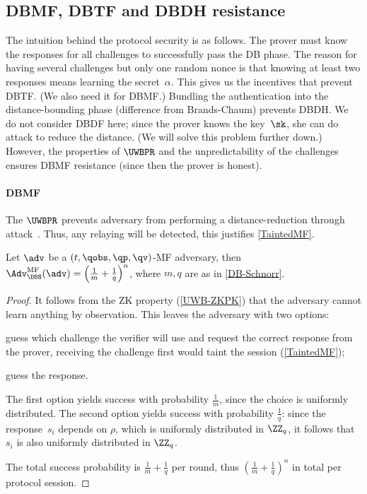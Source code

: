 \subsection{\acs*{DBMF}, \acs*{DBTF} and \acs*{DBDH} resistance}

The intuition behind the protocol security is as follows.
The prover must know the responses for all challenges to successfully pass the 
\ac{DB} phase.
The reason for having several challenges but only one random nonce is that 
knowing at least two responses means learning the secret~\(\alpha\).
This gives us the incentives that prevent \ac{DBTF}.
(We also need it for \ac{DBMF}.)
Bundling the authentication into the distance-bounding phase (difference from 
Brands-Chaum) prevents \ac{DBDH}.
We do not consider \ac{DBDF} here; since the prover knows the key~\(\sk\), she 
can do  attack to reduce the distance.
(We will solve this problem further down.)
However, the properties of \(\UWBPR\) and the unpredictability of the 
challenges ensures \ac{DBMF} resistance (since then the prover is honest).

\paragraph{\Acl{DBMF}}

The \(\UWBPR\) prevents  adversary from performing a 
distance-reduction through  attack~\cite{UWBPR}.
Thus, any relaying will be detected, \ie this justifies \cref{TaintedMF}.

\begin{theorem}
  Let \(\adv\) be a \((t, \qobs, \qp, \qv)\)-MF adversary, then 
  \(\Adv_{\DBS}^{\text{MF}}(\adv) = \left(\frac{1}{m}+\frac{1}{q}\right)^n\), 
  where \(m, q\) are as in \cref{DB-Schnorr}.
\end{theorem}

\begin{proof}
  It follows from the \ac{ZK} property (\cref{UWB-ZKPK}) that the adversary 
  cannot learn anything by observation.
  This leaves the adversary with two options:
  \begin{enumerate*}
  \item guess which challenge the verifier will use and request the correct 
    response from the prover, receiving the challenge first would taint the 
    session (\cref{TaintedMF});
  \item guess the response.
  \end{enumerate*}
  The first option yields success with probability \(\frac{1}{m}\), since the 
  choice is uniformly distributed.
  The second option yields success with probability \(\frac{1}{q}\): since the 
  response~\(s_i\) depends on \(\rho\), which is uniformly distributed in 
  \(\ZZ_q\), it follows that \(s_i\) is also uniformly distributed in 
  \(\ZZ_q\).

  The total success probability is \(\frac{1}{m} + \frac{1}{q}\) per round, 
  thus \(\left(\frac{1}{m}+\frac{1}{q}\right)^n\) in total per protocol 
  session.
\end{proof}

